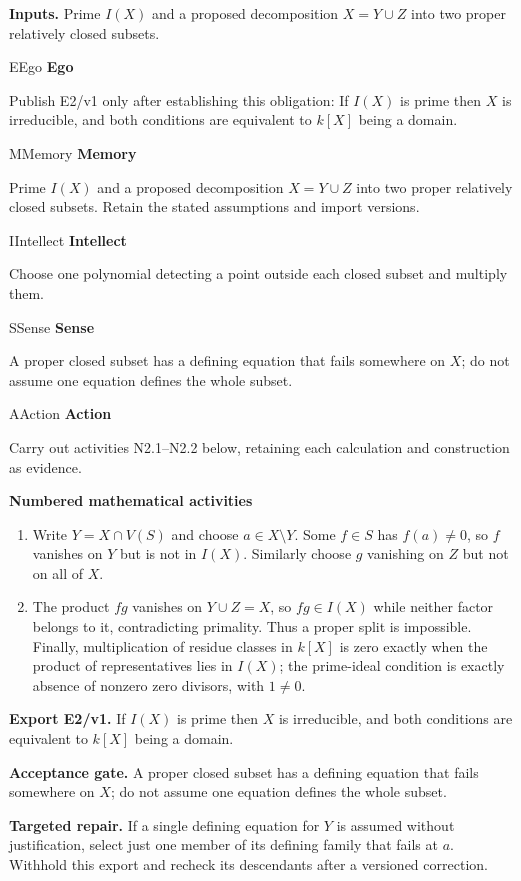 \documentclass[preprint,12pt,aps,pra,showkeys,amsmath,amssymb,superscriptaddress,floatfix]{revtex4-2}
\theoremstyle{definition}
\theoremstyle{remark}
\newcommand{\mmfaculty}[3]{%
 \begin{mmfacultybox}{#1}{#2}
 {\sffamily\bfseries\color{MMBlue}#2}\par\smallskip #3
 \end{mmfacultybox}}
\newcommand{\field}[2]{\par\smallskip\noindent\textbf{#1.} #2\par}
\begin{document}
\field{Inputs}{Prime \(I(X)\) and a proposed decomposition \(X=Y\cup Z\) into two
proper relatively closed subsets.}

\mmfaculty{E}{Ego}{Publish E2/v1 only after establishing this obligation: If \(I(X)\) is
prime then \(X\) is irreducible, and both conditions are equivalent to
\(k[X]\) being a domain.}

\mmfaculty{M}{Memory}{Prime \(I(X)\) and a proposed decomposition \(X=Y\cup Z\) into two
proper relatively closed subsets. Retain the stated assumptions and
import versions.}

\mmfaculty{I}{Intellect}{Choose one polynomial detecting a point outside each closed subset and
multiply them.}

\mmfaculty{S}{Sense}{A proper closed subset has a defining equation that fails somewhere on
\(X\); do not assume one equation defines the whole subset.}

\mmfaculty{A}{Action}{Carry out activities N2.1--N2.2 below, retaining each calculation and
construction as evidence.}

\smallskip\noindent\textbf{Numbered mathematical activities}

\begin{enumerate}[label=N2.\arabic*,leftmargin=3.4em]

\item Write \(Y=X\cap V(S)\) and choose \(a\in X\setminus Y\). Some \(f\in S\)
has \(f(a)\ne0\), so \(f\) vanishes on \(Y\) but is not in \(I(X)\).
Similarly choose \(g\) vanishing on \(Z\) but not on all of \(X\).

\item The product \(fg\) vanishes on \(Y\cup Z=X\), so \(fg\in I(X)\) while
neither factor belongs to it, contradicting primality. Thus a proper
split is impossible. Finally, multiplication of residue classes in
\(k[X]\) is zero exactly when the product of representatives lies in
\(I(X)\); the prime-ideal condition is exactly absence of nonzero zero
divisors, with \(1\ne0\).

\end{enumerate}

\field{Export E2/v1}{If \(I(X)\) is prime then \(X\) is irreducible, and both conditions are
equivalent to \(k[X]\) being a domain.}

\field{Acceptance gate}{A proper closed subset has a defining equation that fails somewhere on
\(X\); do not assume one equation defines the whole subset.}

\field{Targeted repair}{If a single defining equation for \(Y\) is assumed without
justification, select just one member of its defining family that fails
at \(a\). Withhold this export and recheck its descendants after a
versioned correction.}
\end{document}
